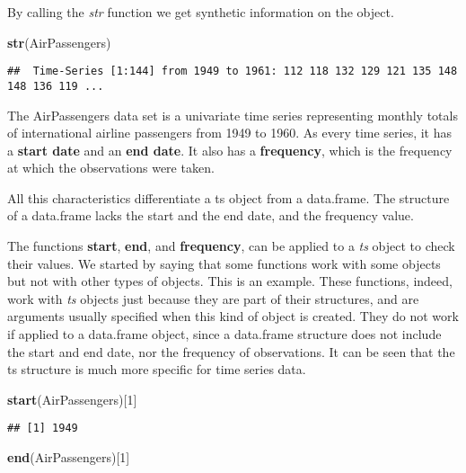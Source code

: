 \documentclass[
]{article}
\newenvironment{Shaded}{\begin{snugshade}}{\end{snugshade}}
\newcommand{\DecValTok}[1]{\textcolor[rgb]{0.00,0.00,0.81}{#1}}
\newcommand{\FunctionTok}[1]{\textcolor[rgb]{0.13,0.29,0.53}{\textbf{#1}}}
\newcommand{\NormalTok}[1]{#1}
\begin{document}
By calling the \emph{str} function we get synthetic information on the object.

\begin{Shaded}
\begin{Highlighting}[]
\FunctionTok{str}\NormalTok{(AirPassengers)}
\end{Highlighting}
\end{Shaded}

\begin{verbatim}
##  Time-Series [1:144] from 1949 to 1961: 112 118 132 129 121 135 148 148 136 119 ...
\end{verbatim}

The AirPassengers data set is a univariate time series representing monthly totals of international airline passengers from 1949 to 1960. As every time series, it has a \textbf{start date} and an \textbf{end date}. It also has a \textbf{frequency}, which is the frequency at which the observations were taken.

All this characteristics differentiate a ts object from a data.frame. The structure of a data.frame lacks the start and the end date, and the frequency value.

The functions \textbf{start}, \textbf{end}, and \textbf{frequency}, can be applied to a \emph{ts} object to check their values. We started by saying that some functions work with some objects but not with other types of objects. This is an example. These functions, indeed, work with \emph{ts} objects just because they are part of their structures, and are arguments usually specified when this kind of object is created. They do not work if applied to a data.frame object, since a data.frame structure does not include the start and end date, nor the frequency of observations. It can be seen that the ts structure is much more specific for time series data.

\begin{Shaded}
\begin{Highlighting}[]
\FunctionTok{start}\NormalTok{(AirPassengers)[}\DecValTok{1}\NormalTok{]}
\end{Highlighting}
\end{Shaded}

\begin{verbatim}
## [1] 1949
\end{verbatim}

\begin{Shaded}
\begin{Highlighting}[]
\FunctionTok{end}\NormalTok{(AirPassengers)[}\DecValTok{1}\NormalTok{]}
\end{Highlighting}
\end{Shaded}
\end{document}
